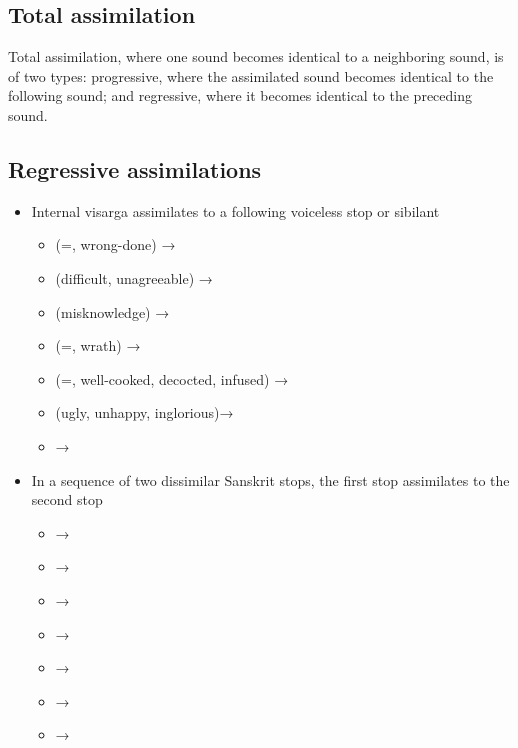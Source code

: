 \subsection*{Total assimilation}

Total assimilation, where one sound becomes identical to a neighboring sound, is of two types: progressive, where the assimilated sound becomes identical to the following sound; and regressive, where it becomes identical to the preceding sound.

\subsection*{Regressive assimilations}

\begin{itemize}
	\item Internal visarga assimilates to a following voiceless stop or sibilant
		\begin{itemize}
			\item {} (=, wrong-done) → 
			\item {} (difficult, unagreeable) → 
			\item {} (misknowledge) → 
			\item {} (=, wrath) → 
			\item {} (=, well-cooked, decocted, infused) → 
			\item {} (ugly, unhappy, inglorious)→ 
			\item {} → 
		\end{itemize}
	\item In a sequence of two dissimilar Sanskrit stops, the first stop assimilates to the second stop
		\begin{itemize}
			\item {} → 
			\item {} → 
			\item {} → 
			\item {} → 
			\item {} → 
			\item {} → 
			\item {} → 
		\end{itemize}

\end{itemize}
